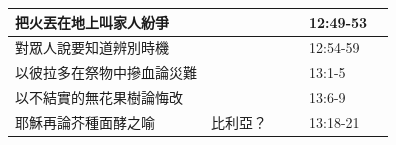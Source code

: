 \begin{table}[H]
\begin{tabular}{p{13.07em}|l|l|l|p{5.285em}|r}
把火丟在地上叫家人紛爭&       &       &       &12:49-53&  \\ \midrule
對眾人說要知道辨別時機&       &       &       &12:54-59&  \\ \midrule
以彼拉多在祭物中摻血論災難&       &       &       &13:1-5&  \\\midrule
以不結實的無花果樹論悔改 &       &       &       &13:6-9 &  \\\midrule
耶穌再論芥種面酵之喻 & 比利亞？   &       &       & \multicolumn{1}{p{5.285em}|}{13:18-21} & \multicolumn{1}{l}{} \\ 
   \bottomrule
    \end{tabular}%
  \label{tab:addlabel}%
\end{table}%



